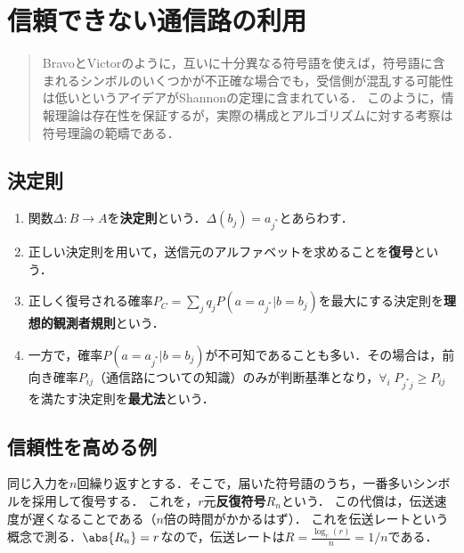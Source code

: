 \documentclass[uplatex,dvipdfmx]{jsreport}
\begin{document}
\chapter{信頼できない通信路の利用}

\begin{quotation}
    BravoとVictorのように，互いに十分異なる符号語を使えば，符号語に含まれるシンボルのいくつかが不正確な場合でも，受信側が混乱する可能性は低いというアイデアがShannonの定理に含まれている．
    このように，情報理論は存在性を保証するが，実際の構成とアルゴリズムに対する考察は符号理論の範疇である．
\end{quotation}

\section{決定則}

\begin{definition}\mbox{}
    \begin{enumerate}
        \item 関数$\Delta:B\to A$を\textbf{決定則}という．$\Delta(b_j)=a_{j^*}$とあらわす．
        \item 正しい決定則を用いて，送信元のアルファベットを求めることを\textbf{復号}という．
        \item 正しく復号される確率$P_C=\sum_{j}q_jP(a=a_{j^*}|b=b_j)$を最大にする決定則を\textbf{理想的観測者規則}という．
        \item 一方で，確率$P(a=a_{j^*}|b=b_j)$が不可知であることも多い．その場合は，前向き確率$P_{ij}$（通信路についての知識）のみが判断基準となり，$\forall_{i}\;P_{j^*j}\ge P_{ij}$を満たす決定則を\textbf{最尤法}という．
    \end{enumerate}
\end{definition}

\section{信頼性を高める例}

\begin{example}
    同じ入力を$n$回繰り返すとする．そこで，届いた符号語のうち，一番多いシンボルを採用して復号する．
    これを，$r$元\textbf{反復符号}$R_n$という．
    この代償は，伝送速度が遅くなることである（$n$倍の時間がかかるはず）．
    これを伝送レートという概念で測る．$\abs{R_n}=r$なので，伝送レートは$R=\frac{\log_r(r)}{n}=1/n$である．
\end{example}
\end{document}
